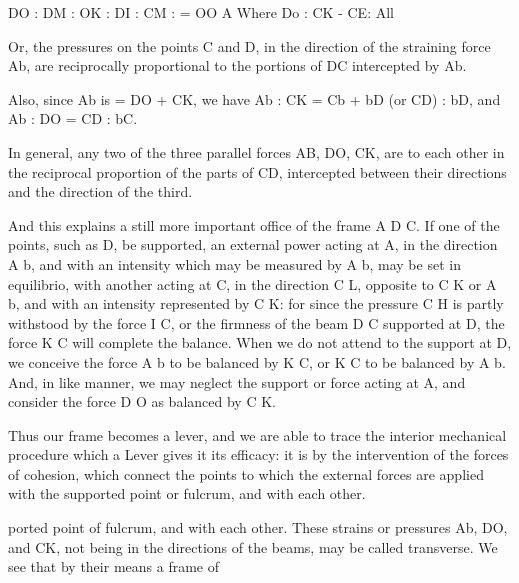 \documentclass{article}
\begin{document}
DO : DM : OK : DI : CM : = OO A Where Do : CK - CE: All

Or, the pressures on the points C and D, in the direction of the straining force Ab, are reciprocally proportional to the portions of DC intercepted by Ab.

Also, since Ab is = DO + CK, we have
Ab : CK = Cb + bD (or CD) : bD, and
Ab : DO = CD : bC.

In general, any two of the three parallel forces AB, DO, CK, are to each other in the reciprocal proportion of the parts of CD, intercepted between their directions and the direction of the third.

And this explains a still more important office of the frame A D C. If one of the points, such as D, be supported, an external power acting at A, in the direction A b, and with an intensity which may be measured by A b, may be set in equilibrio, with another acting at C, in the direction C L, opposite to C K or A b, and with an intensity represented by C K: for since the pressure C H is partly withstood by the force I C, or the firmness of the beam D C supported at D, the force K C will complete the balance. When we do not attend to the support at D, we conceive the force A b to be balanced by K C, or K C to be balanced by A b. And, in like manner, we may neglect the support or force acting at A, and consider the force D O as balanced by C K.

Thus our frame becomes a lever, and we are able to trace the interior mechanical procedure which a Lever gives it its efficacy: it is by the intervention of the forces of cohesion, which connect the points to which the external forces are applied with the supported point or fulcrum, and with each other.

ported point of fulcrum, and with each other.
These strains or pressures Ab, DO, and CK, not
being in the directions of the beams, may be called
transverse. We see that by their means a frame of
\end{document}
